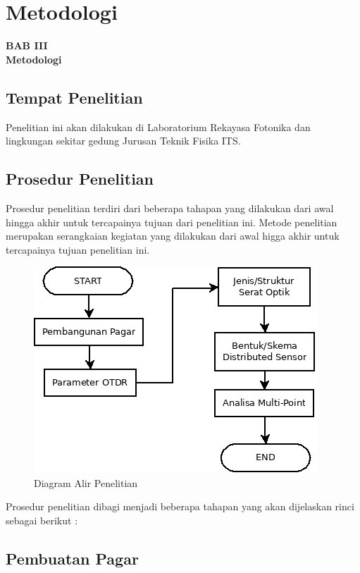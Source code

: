 \documentclass[12pt]{article}
\begin{document}
\newpage

	\setcounter{figure}{0}

	\section{Metodologi}
	
	\begin{center}
		{\large \textbf{BAB III}} \\
		{\large \textbf{Metodologi}}
	\end{center}
	
	\subsection{Tempat  Penelitian}
	
	Penelitian ini akan dilakukan di Laboratorium Rekayasa Fotonika dan lingkungan sekitar gedung Jurusan Teknik Fisika ITS.
	
	\subsection{Prosedur Penelitian}
	
	Prosedur penelitian terdiri dari beberapa tahapan yang dilakukan dari awal hingga akhir untuk tercapainya tujuan dari penelitian ini.
	Metode penelitian merupakan serangkaian kegiatan yang dilakukan dari awal higga akhir untuk tercapainya tujuan penelitian ini.
	
	\begin{figure}[h!]
		\centering
		\captionsetup{justification=centering}
		\includegraphics[width=0.5\linewidth]{images/Bab_3/Bab_3_1}
		\caption[Diagram Alir Penelitian]{\small{Diagram Alir Penelitian}}
	\end{figure}

	Prosedur penelitian dibagi menjadi beberapa tahapan yang akan dijelaskan rinci sebagai berikut :
	
	\subsection{Pembuatan Pagar}
	
\end{document}
